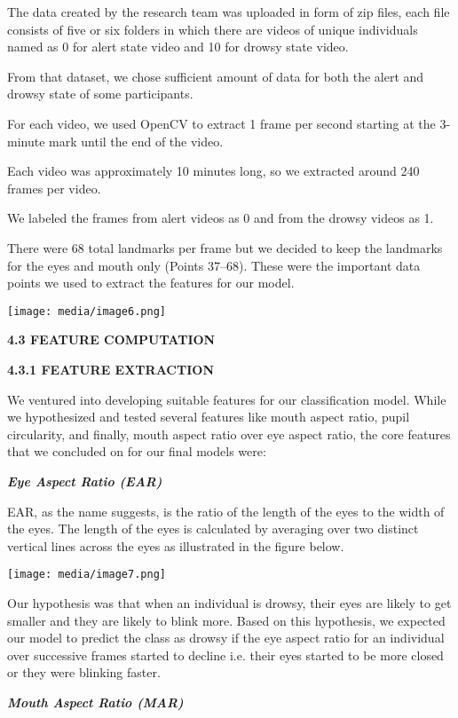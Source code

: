 \documentclass[a4paper,12pt]{article}
\begin{document}
The data created by the research team was uploaded in form of zip files,
each file consists of five or six folders in which there are videos of
unique individuals named as 0 for alert state video and 10 for drowsy
state video.

From that dataset, we chose sufficient amount of data for both the alert
and drowsy state of some participants.

For each video, we used OpenCV to extract 1 frame per second starting at
the 3-minute mark until the end of the video.

Each video was approximately 10 minutes long, so we extracted around 240
frames per video.

We labeled the frames from alert videos as 0 and from the drowsy videos
as 1.

There were 68 total landmarks per frame but we decided to keep the
landmarks for the eyes and mouth only (Points 37--68). These were the
important data points we used to extract the features for our model.

\texttt{[image: media/image6.png]}

\textbf{4.3 FEATURE COMPUTATION}

\textbf{4.3.1 FEATURE EXTRACTION}

We ventured into developing suitable features for our classification
model. While we hypothesized and tested several features like mouth
aspect ratio, pupil circularity, and finally, mouth aspect ratio over
eye aspect ratio, the core features that we concluded on for our final
models were:

\emph{\textbf{Eye Aspect Ratio (EAR)}}

EAR, as the name suggests, is the ratio of the length of the eyes to the
width of the eyes. The length of the eyes is calculated by averaging
over two distinct vertical lines across the eyes as illustrated in the
figure below.

\texttt{[image: media/image7.png]}

Our hypothesis was that when an individual is drowsy, their eyes are
likely to get smaller and they are likely to blink more. Based on this
hypothesis, we expected our model to predict the class as drowsy if the
eye aspect ratio for an individual over successive frames started to
decline i.e. their eyes started to be more closed or they were blinking
faster.

\emph{\textbf{Mouth Aspect Ratio (MAR)}}
\end{document}
